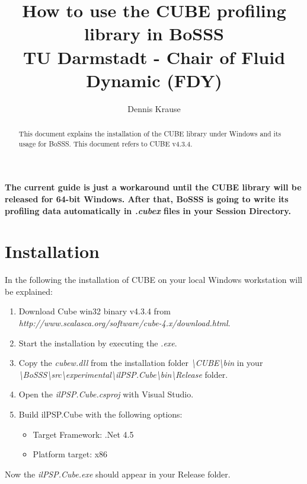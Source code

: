 \documentclass[11pt,twoside,a4paper]{fdyartcl}
\title{How to use the CUBE profiling library in BoSSS\\TU Darmstadt - Chair of Fluid Dynamic (FDY)}
\author{Dennis Krause}
\theoremstyle{myPlain}
\theoremstyle{myDefinition}
\begin{document}


\maketitle


\begin{abstract}
This document explains the installation of the CUBE library under Windows and its usage for BoSSS. This document refers to CUBE v4.3.4.
\end{abstract}


\textbf{The current guide is just a workaround until the CUBE library will be released for 64-bit Windows. After that, BoSSS is going to write its profiling data automatically in \textit{.cubex} files in your Session Directory.}

\section{Installation}
In the following the installation of CUBE on your local Windows workstation will be explained:
\begin{enumerate} 
	\item Download Cube win32 binary v4.3.4 from \\ \emph{http://www.scalasca.org/software/cube-4.x/download.html}.
	\item Start the installation by executing the \textit{.exe}.
	\item Copy the \textit{cubew.dll} from the installation folder \textit{\textbackslash CUBE\textbackslash bin} in your \\ \textit{\textbackslash BoSSS\textbackslash src\textbackslash experimental\textbackslash ilPSP.Cube\textbackslash bin\textbackslash Release } folder.	
	\item Open the \textit{ilPSP.Cube.csproj} with Visual Studio.
	\item Build ilPSP.Cube with the following options:
	\begin{itemize}
		\item Target Framework: .Net 4.5
		\item Platform target: x86 
	\end{itemize} 	
\end{enumerate} 
Now the \textit{ilPSP.Cube.exe} should appear in your Release folder.
\end{document}
